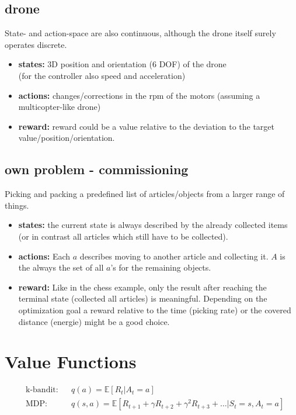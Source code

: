 \documentclass[11pt,a4paper]{article}
\begin{document}
\subsection{drone}

State- and action-space are also continuous, although the drone itself surely operates discrete.

\begin{itemize}
    \item \textbf{states:} 3D position and orientation ($6$ DOF) of the drone \\ (for the controller also speed and acceleration)
    \item \textbf{actions:} changes/corrections in the rpm of the motors (assuming a multicopter-like drone)
    \item \textbf{reward:} reward could be a value relative to the deviation to the target value/position/orientation.
\end{itemize}


\subsection{own problem - commissioning}

Picking and packing a predefined list of articles/objects from a larger range of things. 

\begin{itemize}
    \item \textbf{states:} the current state is always described by the already collected items\\
    (or in contrast all articles which still have to be collected).
    \item \textbf{actions:} Each $a$ describes moving to another article and collecting it. 
    $A$ is the always the set of all $a$'s for the remaining objects.
    \item \textbf{reward:} Like in the chess example, only the result after reaching the terminal state (collected all articles)
    is meaningful. Depending on the optimization goal a reward relative to the time (picking rate) or the covered distance (energie)
    might be a good choice.
\end{itemize}


\section{Value Functions}


\begin{align*}
&\text{k-bandit:} && q(a)=\mathbb{E}[R_{t}|A_{t}=a] \\
&\text{MDP:}      && q(s,a)= \mathbb{E}[ R_{t+1} +\gamma R_{t+2} +\gamma^{2}R_{t+3}+\dots | S_{t}=s, A_{t}=a]
\end{align*}
\end{document}
